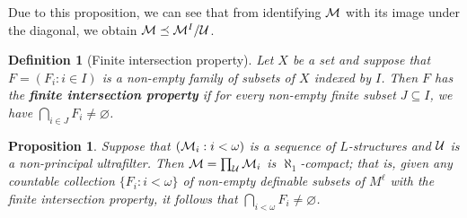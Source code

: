 \documentclass[10pt]{article}
\theoremstyle{newstyle}
\newtheorem{prop}[thm]{Proposition}
\newtheorem{defn}[thm]{Definition}
\begin{document}
Due to this proposition, we can see that from identifying ${\cal M}$ with its image under the 
diagonal, we obtain ${\cal M} \preceq {\cal M}^I / {\cal U}$. 

\begin{defn}[Finite intersection property]
Let $X$ be a set and suppose that $F = (F_i : i \in I)$ is a non-empty family of subsets of $X$ 
indexed by $I$. Then $F$ has the {\bf finite intersection property} if for every non-empty finite 
subset $J \subseteq I$, we have $\bigcap_{i \in J} F_i \neq \varnothing$. 
\end{defn}

\begin{prop}
Suppose that $({\cal M}_i : i < \omega)$ is a sequence of $L$-structures and 
${\cal U}$ is a non-principal ultrafilter. Then ${\cal M} = \prod_{\cal U} {\cal M}_i$ is 
$\aleph_1$-compact; that is, given any countable collection 
$\{F_i : i < \omega\}$ of non-empty 
definable subsets of $M^\ell$ with the finite intersection property, 
it follows that $\bigcap_{i<\omega} F_i \neq \varnothing$. 
\end{prop}
\end{document}
